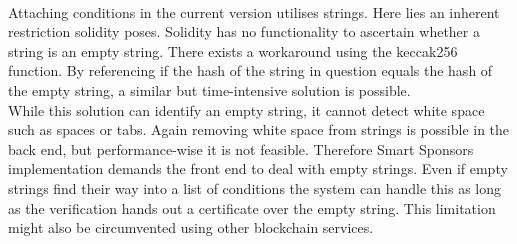 \\
Attaching conditions in the current version utilises strings. Here lies an inherent restriction solidity poses. Solidity has no functionality to ascertain whether a string is an empty string. There exists a workaround using the keccak256 function. By referencing if the hash of the string in question equals the hash of the empty string, a similar but time-intensive solution is possible.\\
While this solution can identify an empty string, it cannot detect white space such as spaces or tabs. Again removing white space from strings is possible in the back end, but performance-wise it is not feasible. Therefore Smart Sponsors implementation demands the front end to deal with empty strings. Even if empty strings find their way into a list of conditions the system can handle this as long as the verification hands out a certificate over the empty string. This limitation might also be circumvented using other blockchain services.
